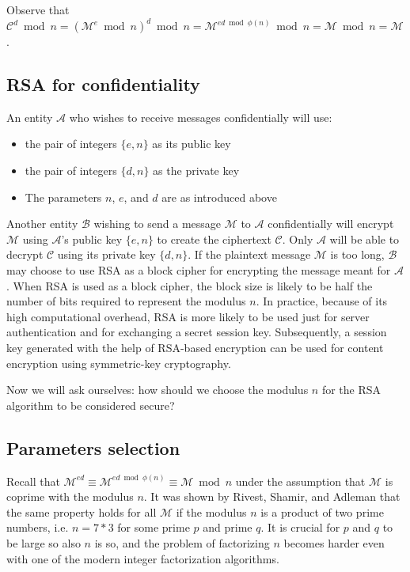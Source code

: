 Observe that $\mathcal{C}^d \bmod n = (\mathcal{M}^e \bmod n)^d \bmod n = \mathcal{M}^{ed \bmod \phi(n)} \bmod n = \mathcal{M} \bmod n = \mathcal{M}$.

\subsection{RSA for confidentiality}

An entity $\mathcal{A}$ who wishes to receive messages confidentially will use:
\begin{itemize}
	\item the pair of integers $\{e, n\}$ as its public key
	\item the pair of integers $\{d, n\}$ as the private key
	\item The parameters $n$, $e$, and $d$ are as introduced above
\end{itemize}

Another entity $\mathcal{B}$ wishing to send a message $\mathcal{M}$ to $\mathcal{A}$ confidentially will encrypt $\mathcal{M}$ using $\mathcal{A}$’s public key $\{e, n\}$ to create the ciphertext $\mathcal{C}$. Only $\mathcal{A}$ will be able to decrypt $\mathcal{C}$ using its private key $\{d, n\}$.  If the plaintext message $\mathcal{M}$ is too long, $\mathcal{B}$ may choose to use RSA as a block cipher for encrypting the message meant for $\mathcal{A}$. When RSA is used as a block cipher, the block size is likely to be half the number of bits required to represent the modulus $n$. In practice, because of its high computational overhead, RSA is more likely to be used just for server authentication and for exchanging a secret session key.  Subsequently, a session key generated with the help of RSA-based encryption can be used for content encryption using symmetric-key cryptography.

Now we will ask ourselves: how should we choose the modulus $n$ for the RSA algorithm to be considered secure?

\subsection{Parameters selection}

Recall that $\mathcal{M}^{ed} \equiv \mathcal{M}^{ed \bmod \phi(n)} \equiv \mathcal{M} \bmod n$ under the assumption that $\mathcal{M}$ is coprime with the modulus $n$. It was shown by Rivest, Shamir, and Adleman that the same property holds for all $\mathcal{M}$ if the modulus $n$ is a product of two prime numbers, i.e.  $n = 7 * 3$ for some prime $p$ and prime $q$. It is crucial for $p$ and $q$ to be large so also $n$ is so, and the problem of factorizing $n$ becomes harder even with one of the modern integer factorization algorithms.

